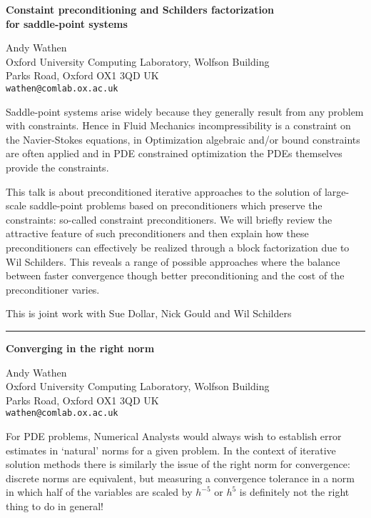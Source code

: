 \documentclass[twosided]{report}
\begin{document}
\begin{center}
{\large			%
{\bf Constaint preconditioning and Schilders factorization \\
	for saddle-point systems}}

	Andy Wathen \\
	Oxford University Computing Laboratory, Wolfson Building \\
	Parks Road, Oxford OX1 3QD UK \\
	{\tt wathen@comlab.ox.ac.uk}
\end{center}
Saddle-point systems arise widely because they generally
result from any problem with constraints. Hence in Fluid
Mechanics incompressibility is a constraint on the
Navier-Stokes equations, in Optimization algebraic and/or
bound constraints are often applied and in PDE constrained
optimization the PDEs themselves provide the constraints.


This talk is about preconditioned iterative approaches to
the solution of large-scale saddle-point problems based on
preconditioners which preserve the constraints: so-called
constraint preconditioners. We will briefly review the
attractive feature of such preconditioners and then explain
how these preconditioners can effectively be realized
through a block factorization due to Wil Schilders. This
reveals a range of possible approaches where the balance
between faster convergence though better preconditioning and
the cost of the preconditioner varies.

This is joint
work with Sue Dollar, Nick Gould and Wil Schilders


	\begin{center} \rule{6in}{1pt} \end{center}

\begin{center}
{\large			%
{\bf Converging in the right norm}}

	Andy Wathen \\
	Oxford University Computing Laboratory, Wolfson Building \\
	Parks Road, Oxford OX1 3QD UK \\
	{\tt wathen@comlab.ox.ac.uk}
\end{center}
For PDE problems, Numerical Analysts would always wish to
establish error estimates in `natural' norms for a given
problem. In the context of iterative solution methods there
is similarly the issue of the right norm for convergence:
discrete norms are equivalent, but measuring a convergence
tolerance in a norm in which half of the variables are
scaled by $h^{-5}$ or $h^5$ is definitely not the right
thing to do in general! 
\end{document}
